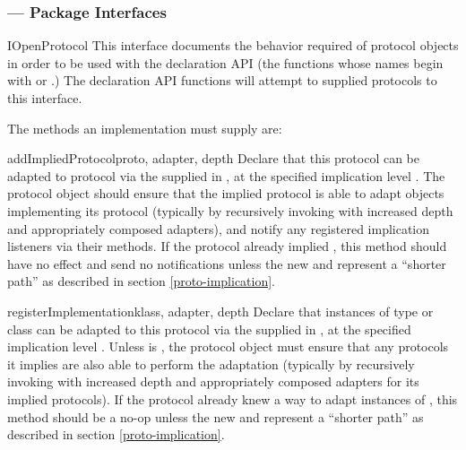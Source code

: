\begin{verbatim%
}
\begin{verbatim%
}
\begin{verbatim%
}
\begin{verbatim%
}
\begin{verbatim%
}
\begin{verbatim%
}
\subsubsection{ --- Package Interfaces\label{protocols-interfaces-module}}


\begin{classdesc*}{IOpenProtocol}
This interface documents the behavior required of protocol objects in order to
be used with the  declaration API (the functions whose names
begin with  or .)  The declaration API functions
will attempt to  supplied protocols to this interface.

The methods an  implementation must supply are:

\begin{methoddesc}{addImpliedProtocol}{proto, adapter, depth}
Declare that this protocol can be adapted to protocol  via the
 supplied in , at the specified implication
level .  The protocol object should ensure that the implied protocol
is able to adapt objects implementing its protocol (typically by recursively
invoking  with increased depth and
appropriately composed adapters), and notify any registered implication
listeners via their  methods.  If the protocol
already implied , this method should have no effect and send no
notifications unless the new  and  represent a
``shorter path'' as described in section \ref{proto-implication}.
\end{methoddesc}

\begin{methoddesc}{registerImplementation}{klass, adapter, depth}
Declare that instances of type or class  can be adapted to this
protocol via the  supplied in , at the
specified implication level .  Unless  is
, the protocol object must ensure that
any protocols it implies are also able to perform the adaptation (typically
by recursively invoking  with increased depth
and appropriately composed adapters for its implied protocols).  If the
protocol already knew a way to adapt instances of , this method
should be a no-op unless the new  and  represent a
``shorter path'' as described in section \ref{proto-implication}.
\end{methoddesc}


\end{classdesc*}
\end{verbatim%
}
\end{verbatim%
}
\end{verbatim%
}
\end{verbatim%
}
\end{verbatim%
}
\end{verbatim%
}
